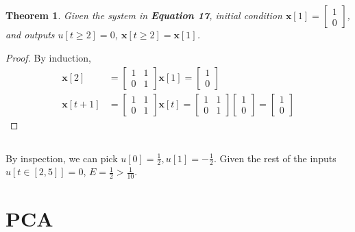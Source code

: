 \documentclass[]{article}
\newtheorem{genthm}{Theorem}
\begin{document}
\subsection{}

\begin{genthm}
Given the system in \textbf{Equation 17}, initial condition \(\bm{x}[1] = \begin{bmatrix} 1 \\ 0 \end{bmatrix}\), and outputs \(u[t \geqslant 2] = 0\), \(\bm{x}[t \geqslant 2] = \bm{x}[1]\).
\end{genthm}

\begin{proof}
By induction,
\begin{align}
	\bm{x}[2] &=
	\begin{bmatrix}
	1 & 1 \\
	0 & 1
	\end{bmatrix} \bm{x}[1] =
	\begin{bmatrix}
	1 \\
	0
	\end{bmatrix} \\
	\bm{x}[t + 1] &= \begin{bmatrix}
	1 & 1 \\
	0 & 1
	\end{bmatrix} \bm{x}[t] = \begin{bmatrix}
	1 & 1 \\
	0 & 1
	\end{bmatrix}
	\begin{bmatrix}
	1 \\
	0
	\end{bmatrix} =
	\begin{bmatrix}
	1 \\
	0
	\end{bmatrix}
\end{align}
\end{proof}

\subsection{}

By inspection, we can pick \(u[0] = \frac{1}{2}, u[1] = -\frac{1}{2}\).
Given the rest of the inputs \(u[t \in [2, 5]] = 0\), \(E = \frac{1}{2} > \frac{1}{10}\).

\section{PCA}
\end{document}
